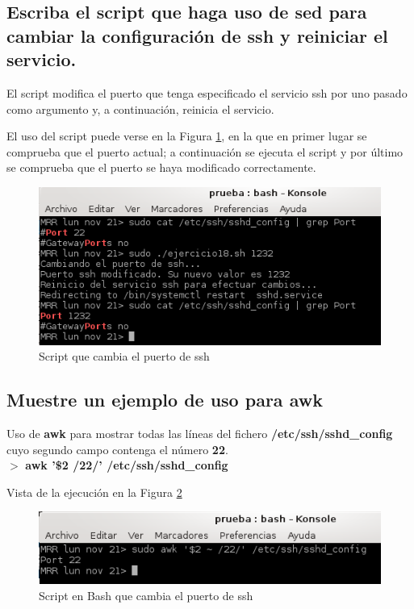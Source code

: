 \subsection{Escriba el
	script que haga uso de sed para cambiar la configuración de ssh y
	reiniciar el servicio.}
\cite{enlace27}

	
	
	El script modifica el puerto que tenga especificado el servicio ssh por uno pasado como argumento y, a continuación, reinicia el servicio.
	
\newpage

	El uso del script puede verse en la Figura \ref{fig:figura77}, en la que en primer lugar se comprueba que el puerto actual; a continuación se ejecuta el script y por último se comprueba que el puerto se haya modificado correctamente.
	
	\begin{figure}[H] %
		\centering
		\includegraphics[scale=0.9]{figuras/figura77.png} 
		\caption{Script que cambia el puerto de ssh}
		\label{fig:figura77}
	\end{figure}

\subsection{Muestre un ejemplo de uso para awk}

Uso de \textbf{awk} \cite{enlace28} para mostrar todas las líneas del fichero \textbf{/etc/ssh/sshd\_config} cuyo segundo campo contenga el número \textbf{22}.
\\

$ > $ \textbf{awk '\$2 \AC /22/' /etc/ssh/sshd\_config}

Vista de la ejecución en la Figura \ref{fig:figura78}

\begin{figure}[H] %
	\centering
	\includegraphics[scale=0.9]{figuras/figura78.png} 
	\caption{Script en Bash que cambia el puerto de ssh}
	\label{fig:figura78}
\end{figure}

